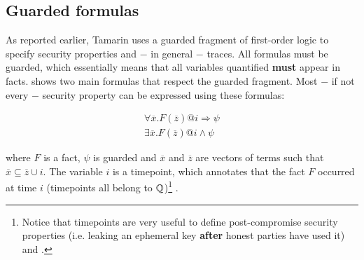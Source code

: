 \subsection{Guarded formulas}
\label{sub:guarded-formulas}

As reported earlier, Tamarin uses a guarded fragment of first-order logic to specify security properties and $-$ in general $-$ traces. All formulas must be guarded, which essentially means that all variables quantified \textbf{must} appear in facts.  shows two main formulas that respect the guarded fragment. Most $-$ if not every $-$ security property can be expressed using these formulas:

\begin{equation}
    \label{eq:guarded-formulas}
    \begin{gathered}
        \forall \overline{x}. F\left(\overline{z}\right) @i \Rightarrow \psi \\
        \exists \overline{x}. F\left(\overline{z}\right) @i \land \psi
    \end{gathered}
\end{equation}

where $F$ is a fact, $\psi$ is guarded and $\overline{x}$ and $\overline{z}$ are vectors of terms such that $\overline{x} \subseteq \overline{z} \cup i$.
The variable $i$ is a timepoint, which annotates that the fact $F$ occurred at time $i$ (timepoints all belong to $\mathbb{Q}$)\footnote{Notice that timepoints are very useful to define post-compromise security properties (i.e. leaking an ephemeral key \textbf{after} honest parties have used it) and \pfs{}.} \cite{TamarinTeachingSlides}.

